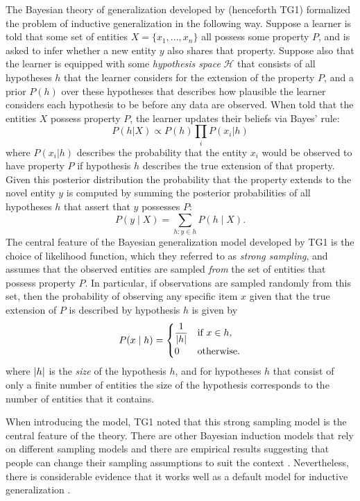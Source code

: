 The Bayesian theory of generalization developed by  (henceforth TG1) formalized the problem of inductive generalization in the following way. Suppose a learner is told that some set of entities $X = \lbrace x_1,. . ., x_n \rbrace$ all possess some property $P$, and is asked to infer whether a new entity $y$ also shares that property. Suppose also that the learner is equipped with some {\it hypothesis space} $\mathcal{H}$ that consists of all hypotheses $h$ that the learner considers for the extension of the property $P$, and a prior $P(h)$ over these hypotheses that describes how plausible the learner considers each hypothesis to be before any data are observed. When told that the entities $X$ possess property $P$, the learner updates their beliefs via Bayes' rule:
$$ 
P(h | X) \propto P(h) \prod_{i} P(x_i | h)
$$
where $P(x_i | h)$ describes the probability that the entity $x_i$ would be observed to have property $P$ if hypothesis $h$ describes the true extension of that property. Given this posterior distribution the probability that the property extends to the novel entity $y$ is computed by summing the posterior probabilities of all hypotheses $h$ that assert that $y$ possesses $P$:
\begin{equation}
\label{eq:generalization}
P(y \mid X) = \sum_{h:y \in h} P(h \mid X).
\end{equation}
The central feature of the Bayesian generalization model developed by TG1 is the choice of likelihood function, which they referred to as {\it strong sampling}, and assumes that the observed entities are sampled {\it from} the set of entities that possess property $P$. In particular, if observations are sampled randomly from this set, then the probability of observing any specific item $x$ given that the true extension of $P$ is described by hypothesis $h$ is given by
\begin{equation}
P(x \mid h) = \begin{cases}
 \dfrac{1}{\lvert h\rvert} & \text{if $x\in h$},\\
 0& \text{otherwise}.
\end{cases}
\end{equation}
where $\lvert h\rvert$ is the {\it size} of the hypothesis $h$, and for hypotheses $h$ that consist of only a finite number of entities the size of the hypothesis corresponds to the number of entities that it contains. 
 
When introducing the model, TG1 noted that this strong sampling model is the central feature of the theory. There are other Bayesian induction models that rely on different sampling models \cite{heit_bayesian_1998,VoorspoelsINPRESS,navarro2012} and there are empirical results suggesting that people can change their sampling assumptions to suit the context \cite{RansomINPRESS,VoorspoelsINPRESS,gweon_infants_2010}. Nevertheless, there is considerable evidence that it works well as a default model for inductive generalization \cite{sanjana_bayesian_2003}. 

